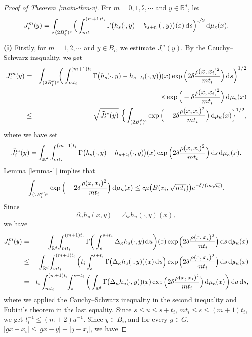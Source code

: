 \documentclass[11pt,a4paper]{article}
\def\R{\mathbb{R}}
\def\d{\textup{d}}
\theoremstyle{definition}\newtheorem{remark}[theorem]{Remark}
\begin{document}
\begin{proof}[Proof of Theorem \ref{main-thm-v}]
For $m=0,1,2,\cdots$ and $y\in\R^d$, let
\begin{eqnarray*}
J_i^m(y)=\int_{(2B_i^\rho)^c}\Big(\int_{mt_i}^{(m+1)t_i} \Gamma\big( h_s(\cdot,y)- h_{s+t_i}(\cdot,y)\big)(x) \,\d s\Big)^{1/2}\,\d\mu_\kappa(x).
\end{eqnarray*}

\textbf{(i)} Firstly, for $m=1,2,\cdots$ and $y\in B_i$, we estimate $J_i^m(y)$. By the Cauchy--Schwarz inequality, we get
\begin{eqnarray}\label{proof-main-3-1}
J_i^m(y)&=&\int_{(2B_i^\rho)^c}\!\!\bigg(\int_{mt_i}^{(m+1)t_i}\Gamma\big( h_s(\cdot,y)- h_{s+t_i}(\cdot,y)\big)(x)\exp\Big(2\delta\frac{\rho(x,x_i)^2}{mt_i}\Big)\,\d s\bigg)^{1/2}\cr
&&\times\exp\Big(-\delta\frac{\rho(x,x_i)^2}{mt_i}\Big)\,\d\mu_\kappa(x)\cr
&\leq&\sqrt{\tilde{J}_i^m(y)}~\Big\{\int_{(2B_i^\rho)^c} \exp\Big(-2\delta\frac{\rho(x,x_i)^2}{mt_i}\Big)\,\d\mu_\kappa(x)\Big\}^{1/2},
\end{eqnarray}
where we have set
$$\tilde{J}_i^m(y)=\int_{\R^d}\int_{mt_i}^{(m+1)t_i}\Gamma\big( h_s(\cdot,y)- h_{s+t_i}(\cdot,y)\big)(x)\exp\Big(2\delta\frac{\rho(x,x_i)^2}{mt_i}\Big)\,\d s\,\d\mu_\kappa(x).$$
Lemma \ref{lemma-1} implies that
\begin{eqnarray}\label{proof-main-3-2}
\int_{(2B_i^\rho)^c} \exp\Big(-2\delta\frac{\rho(x,x_i)^2}{mt_i}\Big)\,\d\mu_\kappa(x)\leq c\mu\big(B(x_i,\sqrt{mt_i})\big)e^{-\delta/(m\sqrt{t_i})}.
\end{eqnarray}
Since
$$\partial_u h_u(x,y)=\Delta_\kappa h_u(\cdot,y)(x),$$
we have
\begin{eqnarray*}
\tilde{J}_i^m(y)&=&\int_{\R^d}\!\int_{mt_i}^{(m+1)t_i}\Gamma\bigg(\int_s^{s+t_i}  \Delta_\kappa h_u(\cdot,y)\,\d u\bigg)(x)\exp\Big(2\delta\frac{\rho(x,x_i)^2}{mt_i}\Big)\,\d s\,\d\mu_\kappa(x)\\
&\leq&\int_{\R^d}\!\int_{mt_i}^{(m+1)t_i}\Big(t_i\int_s^{s+t_i}\Gamma\big(\Delta_\kappa h_u(\cdot,y)\big)(x) \,\d u\Big)\exp\Big(2\delta\frac{\rho(x,x_i)^2}{mt_i}\Big)\,\d s\,\d\mu_\kappa(x)\\
&=&t_i\int_{mt_i}^{(m+1)t_i}\!\!\int_s^{s+t_i}\bigg( \int_{\R^d}\Gamma\big(\Delta_\kappa h_u(\cdot,y))(x)\exp\Big(2\delta\frac{\rho(x,x_i)^2}{mt_i}\Big)\,\d\mu_\kappa(x)\bigg)\,\d u\,\d s,
\end{eqnarray*}
where we applied the Cauchy--Schwarz inequality in the second inequality and Fubini's theorem in the last equality. Since $s\leq u\leq s+t_i$, $mt_i\leq s\leq (m+1)t_i$, we get $t_i^{-1} \leq(m+2)u^{-1}$. Since $y\in B_i$, and for every $g\in G$, $|gx-x_i|\leq|gx-y|+|y-x_i|$, we have

\end{proof}
\end{document}
